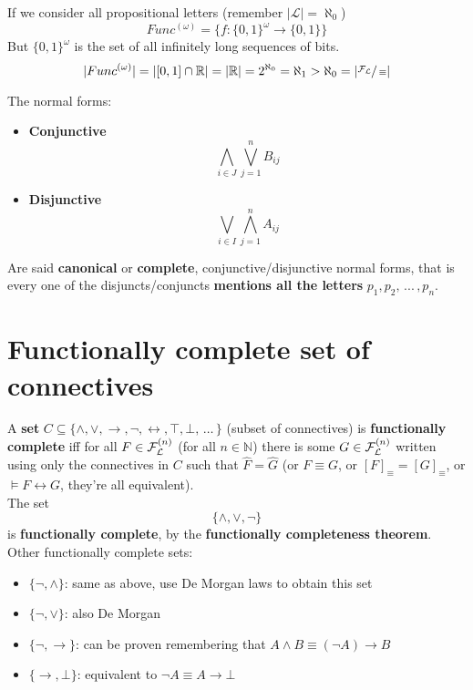 	If we consider all propositional letters (remember $|\mathcal{L}| = \aleph_0$)
	$$ Func^{(\omega)} = \{f: \{0,1\}^\omega \rightarrow \{0,1\}\}$$
	But $\{0,1\}^\omega$ is the set of all infinitely long sequences of bits.\\
	$$ |Func^{(\omega)}| = |[0,1] \cap \mathbb{R}| = |\mathbb{R}| = 2^{\aleph_0} = \aleph_1 > \aleph_0 = |\sfrac{\mathcal{F}_\mathcal{L}}{\equiv}| $$

	\vfill

	The normal forms:
	\begin{itemize}
		\item \textbf{Conjunctive}
		$$ \bigwedge_{i \in J} \bigvee_{j=1}^n B_{ij} $$
		\item \textbf{Disjunctive}
		$$ \bigvee_{i \in I} \bigwedge_{j=1}^n A_{ij} $$
	\end{itemize}

	Are said \textbf{canonical} or \textbf{complete}, conjunctive/disjunctive normal forms, that is every one of the disjuncts/conjuncts \textbf{mentions all the letters} $p_1, p_2, \, ... \, , p_n$.\\

%


	\section{Functionally complete set of connectives}

	A \textbf{set} $C \subseteq \{\wedge, \vee, \rightarrow, \neg, \leftrightarrow, \top, \bot, \, \dots \, \}$ (subset of connectives) is \textbf{functionally complete} iff for all $F \in \mathcal{F}_\mathcal{L}^{(n)}$ (for all $n \in \mathbb{N}$) there is some $G \in \mathcal{F}_\mathcal{L}^{(n)}$ written using only the connectives in $C$ such that $\hat F = \hat G$ (or $F \equiv G$, or $[F]_\equiv = [G]_\equiv$, or $\models F \leftrightarrow G$, they're all equivalent).\\

	The set
	$$ \{\wedge, \vee, \neg \}$$
	is \textbf{functionally complete}, by the \textbf{functionally completeness theorem}.\\

	Other functionally complete sets:
	\begin{itemize}
		\item $\{\neg, \wedge\}$: same as above, use De Morgan laws to obtain this set
		\item $\{\neg, \vee\}$: also De Morgan
		\item $\{\neg, \rightarrow\}$: can be proven remembering that $A \wedge B \equiv (\neg A) \rightarrow B$
		\item $\{\rightarrow, \bot\}$: equivalent to $\neg A \equiv A \rightarrow \bot$
	\end{itemize}

